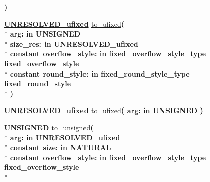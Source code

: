 \begin{DoxyCompactItemize}
{\bfseries  )} 
\item 
{\bfseries {\bfseries {\bfseries \hyperlink{classfixed__pkg_ae78bc2b36d22f6abeac163955e8a587d}{U\+N\+R\+E\+S\+O\+L\+V\+E\+D\+\_\+ufixed}} \textcolor{vhdlchar}{ }}} \hyperlink{classfixed__pkg_ade2913ec678d66be09db3a25d30ded44}{to\+\_\+ufixed}{\bfseries  ( }\\*
{\bfseries \textcolor{vhdlchar}{arg\+: }\textcolor{stringliteral}{in }{\bfseries \textcolor{comment}{U\+N\+S\+I\+G\+N\+E\+D}\textcolor{vhdlchar}{ }}}\\*
{\bfseries \textcolor{vhdlchar}{size\+\_\+res\+: }\textcolor{stringliteral}{in }\textcolor{vhdlchar}{U\+N\+R\+E\+S\+O\+L\+V\+E\+D\+\_\+ufixed}}\\*
{\bfseries {\bfseries \textcolor{keywordflow}{constant}\textcolor{vhdlchar}{ }}\textcolor{vhdlchar}{overflow\+\_\+style\+: }\textcolor{stringliteral}{in }\textcolor{vhdlchar}{fixed\+\_\+overflow\+\_\+style\+\_\+type     fixed\+\_\+overflow\+\_\+style}}\\*
{\bfseries {\bfseries \textcolor{keywordflow}{constant}\textcolor{vhdlchar}{ }}\textcolor{vhdlchar}{round\+\_\+style\+: }\textcolor{stringliteral}{in }\textcolor{vhdlchar}{fixed\+\_\+round\+\_\+style\+\_\+type     fixed\+\_\+round\+\_\+style}}\\*
{\bfseries  )} 
\item 
{\bfseries {\bfseries {\bfseries \hyperlink{classfixed__pkg_ae78bc2b36d22f6abeac163955e8a587d}{U\+N\+R\+E\+S\+O\+L\+V\+E\+D\+\_\+ufixed}} \textcolor{vhdlchar}{ }}} \hyperlink{classfixed__pkg_a0540df42999977255e75bf7015888193}{to\+\_\+ufixed}{\bfseries  ( }{\bfseries \textcolor{vhdlchar}{arg\+: }\textcolor{stringliteral}{in }{\bfseries \textcolor{comment}{U\+N\+S\+I\+G\+N\+E\+D}\textcolor{vhdlchar}{ }}}{\bfseries  )} 
\item 
{\bfseries {\bfseries \textcolor{comment}{U\+N\+S\+I\+G\+N\+E\+D}\textcolor{vhdlchar}{ }}} \hyperlink{classfixed__pkg_a56598bb3d7b796e9fcbcedafc6e8b887}{to\+\_\+unsigned}{\bfseries  ( }\\*
{\bfseries \textcolor{vhdlchar}{arg\+: }\textcolor{stringliteral}{in }\textcolor{vhdlchar}{U\+N\+R\+E\+S\+O\+L\+V\+E\+D\+\_\+ufixed}}\\*
{\bfseries {\bfseries \textcolor{keywordflow}{constant}\textcolor{vhdlchar}{ }}\textcolor{vhdlchar}{size\+: }\textcolor{stringliteral}{in }{\bfseries \textcolor{comment}{N\+A\+T\+U\+R\+A\+L}\textcolor{vhdlchar}{ }}}\\*
{\bfseries {\bfseries \textcolor{keywordflow}{constant}\textcolor{vhdlchar}{ }}\textcolor{vhdlchar}{overflow\+\_\+style\+: }\textcolor{stringliteral}{in }\textcolor{vhdlchar}{fixed\+\_\+overflow\+\_\+style\+\_\+type     fixed\+\_\+overflow\+\_\+style}}\\*

\end{DoxyCompactItemize}
